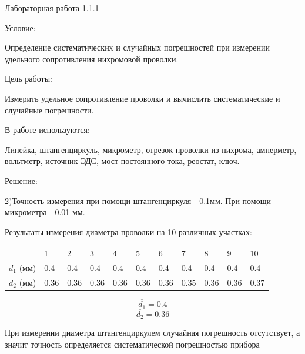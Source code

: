 \documentclass{astroedu-lab}
\begin{document}
\pagestyle{plain}

\begin{problem}{\large Лабораторная работа 1.1.1}

\begin{bfseries}
	Условие:
\end{bfseries}

Определение систематических и случайных погрешностей при измерении удельного сопротивления нихромовой проволки.

\begin{bfseries}
	Цель работы:
\end{bfseries}

Измерить удельное сопротивление проволки и вычислить систематические и случайные погрешности.

\begin{bfseries}
	В работе используются:
\end{bfseries}

Линейка, штангенциркуль, микрометр, отрезок проволки из нихрома, амперметр, вольтметр, источник ЭДС, мост постоянного тока, реостат, ключ.

\begin{bfseries}
	Решение:
\end{bfseries}

2)Точность измерения при помощи штангенциркуля - 0.1мм. При помощи микрометра - 0.01 мм.

Результаты измерения диаметра проволки на 10 различных участках:

\begin{tabular}[t]{|l|l|l|l|l|l|l|l|l|l|l|}
\cline{1-11}
		   & 1 & 2 & 3 & 4 & 5 & 6 & 7 & 8 & 9 & 10\\ \cline{1-11}
$d_1$ (мм) & 0.4 & 0.4 & 0.4 & 0.4 & 0.4 & 0.4 & 0.4 & 0.4 & 0.4 & 					 0.4\\ \cline{1-11}
$d_2$ (мм) & 0.36 & 0.36 & 0.36 & 0.36 & 0.36 & 0.36 & 0.35 & 0.36 & 				 0.36 & 0.37\\ \cline{1-11}
\end{tabular}

\begin{equation}
	\overline{d_1} = 0.4
\end{equation}
\begin{equation}
	\overline{d_2} = 0.36
\end{equation}


При измерении диаметра штангенциркулем случайная погрешность отсутствует, а значит точность определяется систематической погрешностью прибора


\end{problem}
\end{document}
